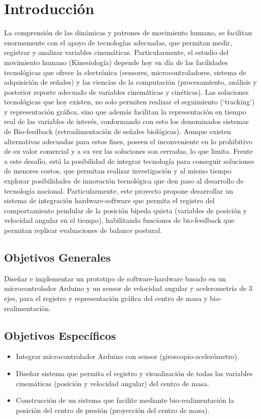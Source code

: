 \documentclass[12pt,a4paper]{article}
\let\stdsection\section
\renewcommand\section{\newpage\stdsection}
\begin{document}
\tableofcontents %
\thispagestyle{empty}
\pagebreak



\section{Introducción}
La comprensión de las dinámicas y patrones de movimiento humano, se facilitan enormemente con el apoyo de tecnologías adecuadas, que permitan medir, registrar y analizar variables cinemáticas. Particularmente, el estudio del movimiento humano (Kinesiología) depende hoy en día de las facilidades tecnológicas que ofrece la electrónica (sensores, microcontroladores, sistema de adquisición de señales) y las ciencias de la computación (procesamiento, análisis y posterior reporte adecuado de  variables cinemáticas y cinéticas).  
Las soluciones tecnológicas que hoy existen, no solo permiten realizar el seguimiento (‘tracking’) y representación gráfica, sino que además facilitan la representación en tiempo real de las variables de interés, conformando con esto los denominados sistemas de Bio-feedback (retroalimentación de señales biológicas). Aunque existen alternativas adecuadas para estos fines, poseen el inconveniente en lo prohibitivo de su valor comercial {\color{red} y a su vez las soluciones son cerradas, lo que limita}.
Frente a este desafío, está la posibilidad de integrar tecnología para conseguir soluciones de menores costos, que permitan realizar investigación y al mismo tiempo explorar posibilidades de innovación tecnológica que den paso al desarrollo de tecnología nacional.
Particularmente, este proyecto propone desarrollar un sistema de integración hardware-software que permita el registro del comportamiento pendular de la posición bípeda quieta (variables de posición y velocidad angular en el tiempo), habilitando funciones de bio-feedback que permitan replicar evaluaciones de balance postural.

\subsection{Objetivos Generales}
Diseñar e implementar un prototipo de software-hardware basado en un microcontrolador Arduino y un sensor de velocidad angular y acelerometría de 3 ejes, para el registro y representación gráfica del centro de masa y bio-realimentación.

\subsection{Objetivos Específicos}
\begin{itemize}
\item Integrar microcontrolador Arduino con sensor (giroscopio-acelerómetro).
\item Diseñar sistema que permita el registro y visualización de todas las variables cinemáticas (posición y velocidad angular) del centro de masa. 
\item Construcción de un sistema que facilite mediante bio-realimentación la posición del centro de presión (proyección del centro de masa).
\end{itemize}	
\end{document}
